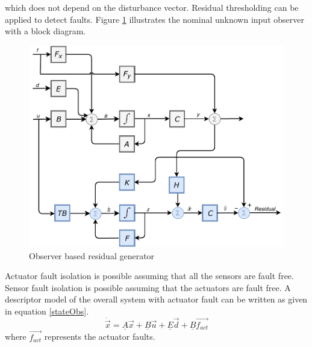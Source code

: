 which does not depend on the disturbance vector. Residual thresholding can be applied to detect faults.
Figure \ref{fig:residualobs} illustrates the nominal unknown input observer with a block diagram. 
\begin{figure}[H]
	\centering
	\includegraphics[width=0.8\linewidth]{figures/UIO_new}
	\caption{Observer based residual generator}
	\label{fig:residualobs}
\end{figure}



Actuator fault isolation is possible assuming that all the sensors are fault free. Sensor fault isolation is possible assuming that the actuators are fault free. A descriptor model of the overall system with actuator fault can be written as given in equation \ref{stateObs}.
\begin{equation}
\dot{\vec{x}} = \underline A\vec{x}+\underline B \vec{u}+\underline E\vec{d} + \underline B\vec{f_{act}}
\label{stateObs34}
\end{equation}
where $\vec{f_{act}}$ represents the actuator faults. 

